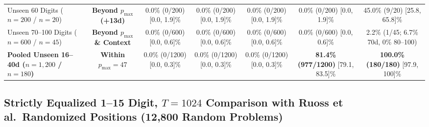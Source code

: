 \documentclass[10pt,twocolumn]{article}
\begin{document}
\begin{table}[t]
{\begin{tabular}{@{}lcccccc@{}}
Unseen 60 Digits ($n=200$ / $n=20$) & \textbf{Beyond $p_{\max}$ (+13d)} & 0.0\% (0/200) [0.0, 1.9]\% & 0.0\% (0/200) [0.0, 1.9]\% & 0.0\% (0/200) [0.0, 1.9]\% & 0.0\% (0/200) [0.0, 1.9]\% & 45.0\% (9/20) [25.8, 65.8]\% \\
Unseen 70--100 Digits ($n=600$ / $n=45$) & \textbf{Beyond $p_{\max}$ \& Context} & 0.0\% (0/600) [0.0, 0.6]\% & 0.0\% (0/600) [0.0, 0.6]\% & 0.0\% (0/600) [0.0, 0.6]\% & 0.0\% (0/600) [0.0, 0.6]\% & 2.2\% (1/45; 6.7\% 70d, 0\% 80--100) \\
\midrule
\textbf{Pooled Unseen 16--40d ($n=1{,}200$ / $n=180$)} & \textbf{Within $p_{\max}=47$} & 0.0\% (0/1200) [0.0, 0.3]\% & 0.0\% (0/1200) [0.0, 0.3]\% & 0.0\% (0/1200) [0.0, 0.3]\% & \textbf{81.4\% (977/1200)} [79.1, 83.5]\% & \textbf{100.0\% (180/180)} [97.9, 100]\% \\
\bottomrule
\end{tabular}%
}
\end{table}

\subsection{Strictly Equalized 1--15 Digit, \texorpdfstring{$T=1024$}{T=1024} Comparison with Ruoss et al.\ Randomized Positions (12,800 Random Problems)}
\end{document}
